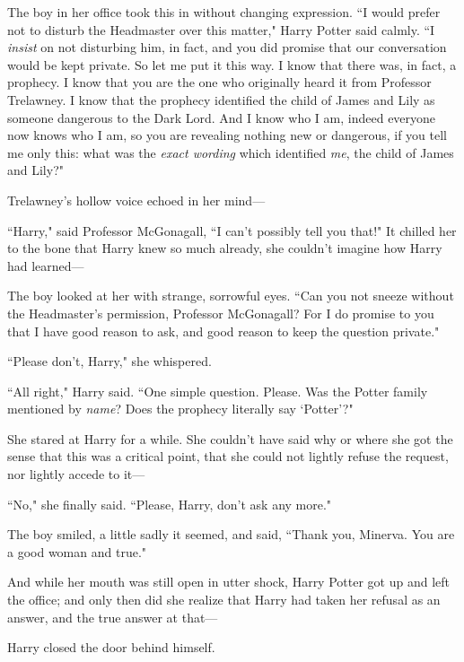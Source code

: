 The boy in her office took this in without changing expression. ``I would prefer not to disturb the Headmaster over this matter," Harry Potter said calmly. ``I \emph{insist} on not disturbing him, in fact, and you did promise that our conversation would be kept private. So let me put it this way. I know that there was, in fact, a prophecy. I know that you are the one who originally heard it from Professor Trelawney. I know that the prophecy identified the child of James and Lily as someone dangerous to the Dark Lord. And I know who I am, indeed everyone now knows who I am, so you are revealing nothing new or dangerous, if you tell me only this: what was the \emph{exact wording} which identified \emph{me}, the child of James and Lily?"

Trelawney's hollow voice echoed in her mind—


``Harry," said Professor McGonagall, ``I can't possibly tell you that!" It chilled her to the bone that Harry knew so much already, she couldn't imagine how Harry had learned—

The boy looked at her with strange, sorrowful eyes. ``Can you not sneeze without the Headmaster's permission, Professor McGonagall? For I do promise to you that I have good reason to ask, and good reason to keep the question private."

``Please don't, Harry," she whispered.

``All right," Harry said. ``One simple question. Please. Was the Potter family mentioned by \emph{name}? Does the prophecy literally say `Potter'?"

She stared at Harry for a while. She couldn't have said why or where she got the sense that this was a critical point, that she could not lightly refuse the request, nor lightly accede to it—

``No," she finally said. ``Please, Harry, don't ask any more."

The boy smiled, a little sadly it seemed, and said, ``Thank you, Minerva. You are a good woman and true." %

And while her mouth was still open in utter shock, Harry Potter got up and left the office; and only then did she realize that Harry had taken her refusal as an answer, and the true answer at that—

Harry closed the door behind himself.

